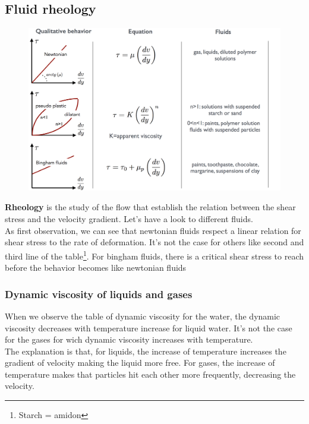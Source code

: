\subsection{Fluid rheology}
	\begin{figure}
	\vspace{-5mm}
	\includegraphics[scale=0.25]{ch1/7}
	\end{figure}
	\textbf{Rheology} is the study of the flow that establish the relation between the shear stress and the velocity gradient. Let's have a look to different fluids. \\
	As first observation, we can see that newtonian fluids respect a linear relation for shear stress to the rate of deformation. It's not the case for others like second and third line of the table\footnote{Starch = amidon}. For bingham fluids, there is a critical shear stress to reach before the behavior becomes like newtonian fluids 
	
\subsubsection{Dynamic viscosity of liquids and gases}	
	When we observe the table of dynamic viscosity for the water, the dynamic viscosity decreases with temperature increase for liquid water. It's not the case for the gases for wich dynamic viscosity increases with temperature. \\ The explanation is that, for liquids, the increase of temperature increases the gradient of velocity making the liquid more free. For gases, the increase of temperature makes that particles hit each other more frequently, decreasing the velocity. 
	
